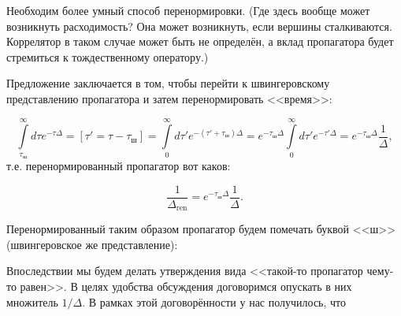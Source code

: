 \documentclass[11pt]{article}
\theoremstyle{remark}
\theoremstyle{definition}
\begin{document}
Необходим более умный способ перенормировки. (Где здесь вообще может возникнуть расходимость? Она может возникнуть, если вершины сталкиваются. Коррелятор в таком случае может быть не определён, а вклад пропагатора будет стремиться к тождественному оператору.)

Предложение заключается в том, чтобы перейти к швингеровскому представлению пропагатора и затем перенормировать <<время>>:

$$\int\limits_{\tau_{\text{ш}}}^{\infty} d\tau e^{-\tau \Delta} = [\tau' = \tau - \tau_{\text{ш}}] = \int\limits_0^{\infty} d\tau' e^{-(\tau' + \tau_{\text{ш}}) \Delta} = e^{-\tau_{\text{ш}} \Delta} \int\limits_0^{\infty} d\tau' e^{-\tau' \Delta} = e^{-\tau_{\text{ш}} \Delta} \frac{1}{\Delta},$$ т.е. перенормированный пропагатор вот каков:

$$\frac{1}{\Delta_{\text{ren}}} = e^{-\tau_{\text{ш}} \Delta} \frac{1}{\Delta}.$$

Перенормированный таким образом пропагатор будем помечать буквой <<ш>> (швингеровское же представление):

\begin{center}
\end{center}

Впоследствии мы будем делать утверждения вида <<такой-то пропагатор чему-то равен>>. В целях удобства обсуждения договоримся опускать в них множитель $1/\Delta$. В рамках этой договорённости у нас получилось, что

\begin{center}
\end{center}
\end{document}
